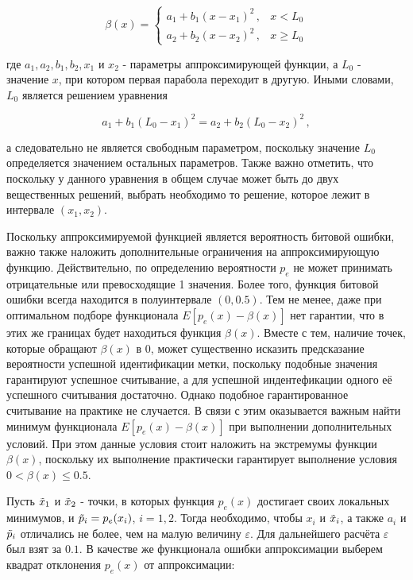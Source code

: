 \documentclass[12pt]{article}
\theoremstyle{definition}
\begin{document}
\begin{equation}
    \beta(x) = \begin{cases}
        a_1+b_1(x-x_1)^2\,, & x<L_0 \\
        a_2+b_2(x-x_2)^2\,, & x\geq L_0
    \end{cases}
\end{equation}

где $a_1, a_2, b_1, b_2, x_1$ и $x_2$ - параметры аппроксимирующей функции, а $L_0$ - значение $x$, при котором первая парабола переходит в другую. Иными словами, $L_0$ является решением уравнения 

\begin{equation}
    a_1+b_1(L_0-x_1)^2 = a_2+b_2(L_0-x_2)^2\,,
\end{equation}

а следовательно не является свободным параметром, поскольку значение $L_0$ определяется значением остальных параметров. Также важно отметить, что поскольку у данного уравнения в общем случае может быть до двух вещественных решений, выбрать необходимо то решение, которое лежит в интервале $(x_1,x_2)$.

Поскольку аппроксимируемой функцией является вероятность битовой ошибки, важно также наложить дополнительные ограничения на аппроксимирующую функцию. Действительно, по определению вероятности $p_e$ не может принимать отрицательные или превосходящие 1 значения. Более того, функция битовой ошибки всегда находится в полуинтервале $(0,0.5)$. Тем не менее, даже при оптимальном подборе функционала $E[p_e(x)-\beta(x)]$ нет гарантии, что в этих же границах будет находиться функция $\beta(x)$. Вместе с тем, наличие точек, которые обращают $\beta(x)$ в 0, может существенно исказить предсказание вероятности успешной идентификации метки, поскольку подобные значения гарантируют успешное считывание, а для успешной индентефикации одного её успешного считывания достаточно. Однако подобное гарантированное считывание на практике не случается. В связи с этим оказывается важным найти минимум функционала $E[p_e(x)-\beta(x)]$ при выполнении дополнительных условий. При этом данные условия стоит наложить на экстремумы функции $\beta(x)$, поскольку их выполнение практически гарантирует выполнение условия $0<\beta(x)\leq 0.5$. 

Пусть $\Tilde{x}_1$ и $\Tilde{x}_2$ - точки, в которых функция $p_e(x)$ достигает своих локальных минимумов, и $\Tilde{p}_i=p_e(x_i)$, $i=1,2$. Тогда необходимо, чтобы $x_i$ и $\Tilde{x}_i$, а также $a_i$ и $\Tilde{p}_i$ отличались не более, чем на малую величину $\varepsilon$. Для дальнейшего расчёта $\varepsilon$ был взят за $0.1$. В качестве же функционала ошибки аппроксимации выберем квадрат отклонения $p_e(x)$ от аппроксимации:
\end{document}
